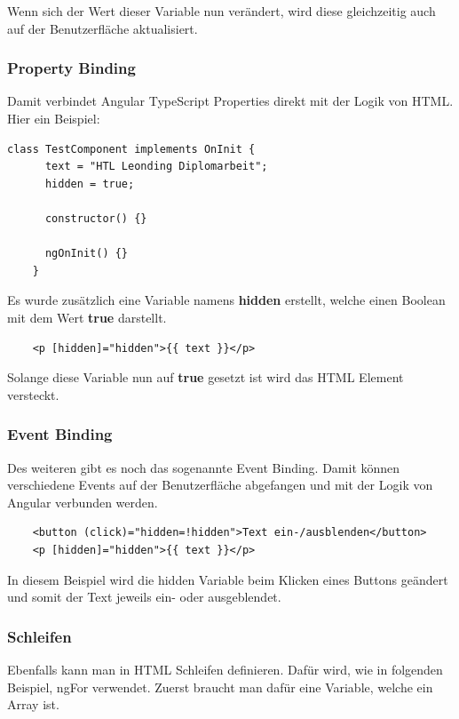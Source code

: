 Wenn sich der Wert dieser Variable nun verändert, wird diese gleichzeitig auch auf der Benutzerfläche aktualisiert. 

\subsubsection{Property Binding}
Damit verbindet Angular TypeScript Properties direkt mit der Logik von HTML. Hier ein Beispiel:

\begin{lstlisting}[caption=Property Binding Angular Variablen]
    class TestComponent implements OnInit {
      text = "HTL Leonding Diplomarbeit";
      hidden = true;
    
      constructor() {}
    
      ngOnInit() {}
    }
\end{lstlisting}

Es wurde zusätzlich eine Variable namens \textbf{hidden} erstellt, welche einen Boolean mit dem Wert \textbf{true} darstellt.

\begin{lstlisting}
    <p [hidden]="hidden">{{ text }}</p>
\end{lstlisting}

Solange diese Variable nun auf \textbf{true} gesetzt ist wird das HTML Element versteckt.

\subsubsection{Event Binding}
Des weiteren gibt es noch das sogenannte Event Binding. Damit können verschiedene Events auf der Benutzerfläche abgefangen und mit der Logik von Angular verbunden werden.

\begin{lstlisting}
    <button (click)="hidden=!hidden">Text ein-/ausblenden</button>
    <p [hidden]="hidden">{{ text }}</p>
\end{lstlisting}

In diesem Beispiel wird die hidden Variable beim Klicken eines Buttons geändert und somit der Text jeweils ein- oder ausgeblendet.

\subsubsection{Schleifen}
Ebenfalls kann man in HTML Schleifen definieren. Dafür wird, wie in folgenden Beispiel, ngFor verwendet.
Zuerst braucht man dafür eine Variable, welche ein Array ist.

